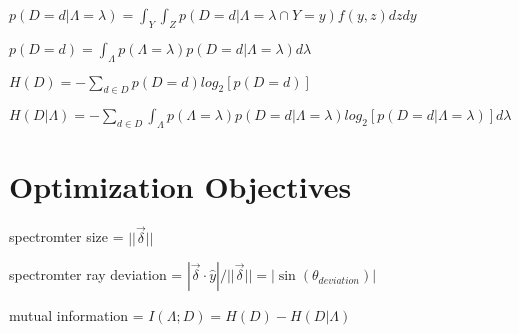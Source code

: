 \documentclass{article}
\begin{document}
$p(D=d|\Lambda=\lambda) = \int_Y\int_Z p(D=d|\Lambda=\lambda \cap Y=y)f(y, z)dz dy$

$p(D=d) = \int_\Lambda p(\Lambda=\lambda) p(D=d|\Lambda=\lambda)d\lambda$

$H(D) = -\sum_{d \in D}p(D=d) log_2[p(D=d)]$

$H(D|\Lambda) = -\sum_{d \in D}\int_{\Lambda}p(\Lambda=\lambda) p(D=d|\Lambda=\lambda) log_2[p(D=d|\Lambda=\lambda)] d\lambda$

\section{Optimization Objectives}\label{sec:optimization-objectives}

spectromter size = $||\vec{\delta}||$

spectromter ray deviation = $| \vec{\delta} \cdot \hat{y} | / ||\vec{\delta}|| = | \sin(\theta_{deviation}) | $

mutual information = $I(\Lambda; D) = H(D) - H(D|\Lambda)$
\end{document}
